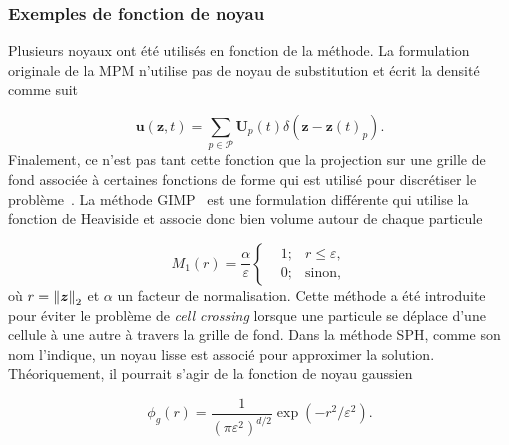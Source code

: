 \subsubsection{Exemples de fonction de noyau}

Plusieurs noyaux ont été utilisés en fonction de la méthode. La formulation originale de la MPM n'utilise pas de noyau de substitution et écrit la densité comme suit

\begin{equation*}
    \bm{u}(\bm{z}, t) = \sum_{p \in \mathcal P} \bm{U}_p(t) \delta (\bm{z}-\bm{z}(t)_p).
\end{equation*}Finalement, ce n'est pas tant cette fonction que la projection sur une grille de fond associée à certaines fonctions de forme qui est utilisé pour discrétiser le problème~\cite{sulsky_particle_1994}. La méthode GIMP~\cite{bardenhagen_generalized_2004} est une formulation différente qui utilise la fonction de Heaviside et associe donc bien volume autour de chaque particule

\begin{equation*}
    M_1(r) = \frac{\alpha}{\varepsilon}\left\{\begin{aligned}
         & 1; & r \leq \varepsilon, \\
         & 0; & \text{sinon},
    \end{aligned}
    \right.
\end{equation*}où $r = \left\lVert \bm{z} \right\rVert_2$ et $\alpha$ un facteur de normalisation. Cette méthode a été introduite pour éviter le problème de \textit{cell crossing} lorsque une particule se déplace d'une cellule à une autre à travers la grille de fond. Dans la méthode SPH, comme son nom l'indique, un noyau lisse est associé pour approximer la solution. Théoriquement, il pourrait s'agir de la fonction de noyau gaussien

\begin{equation*}
    \phi_g(r) = \frac{1}{{(\pi \varepsilon^2)}^{d/2}} \exp(-r^2/\varepsilon^2).
\end{equation*}

